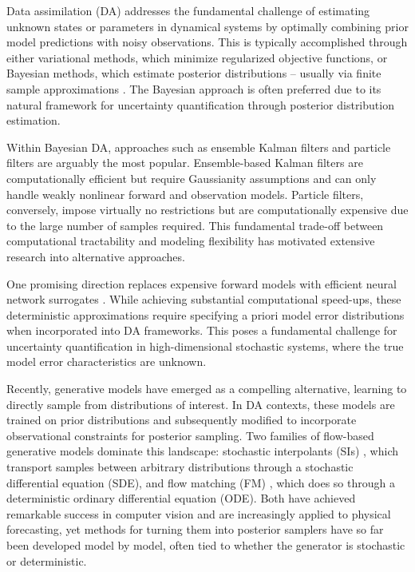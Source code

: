Data assimilation (DA) addresses the fundamental challenge of estimating unknown states or parameters in dynamical systems by optimally combining prior model predictions with noisy observations. This is typically accomplished through either variational methods, which minimize regularized objective functions, or Bayesian methods, which estimate posterior distributions -- usually via finite sample approximations \cite{evensen_data_2022}. The Bayesian approach is often preferred due to its natural framework for uncertainty quantification through posterior distribution estimation.

Within Bayesian DA, approaches such as ensemble Kalman filters and particle filters are arguably the most popular. Ensemble-based Kalman filters are computationally efficient but require Gaussianity assumptions and can only handle weakly nonlinear forward and observation models. Particle filters, conversely, impose virtually no restrictions but are computationally expensive due to the large number of samples required. This fundamental trade-off between computational tractability and modeling flexibility has motivated extensive research into alternative approaches.

One promising direction replaces expensive forward models with efficient neural network surrogates \cite{mucke_deep_2024, cheng_generalised_2022, zhong_reduced-order_2023, chen_reduced-order_2023}. While achieving substantial computational speed-ups, these deterministic approximations require specifying a priori model error distributions when incorporated into DA frameworks. This poses a fundamental challenge for uncertainty quantification in high-dimensional stochastic systems, where the true model error characteristics are unknown.

Recently, generative models have emerged as a compelling alternative, learning to directly sample from distributions of interest. In DA contexts, these models are trained on prior distributions and subsequently modified to incorporate observational constraints for posterior sampling. Two families of flow-based generative models dominate this landscape: stochastic interpolants (SIs) \cite{albergo_stochastic_2023, albergo_building_2023, chen_probabilistic_2024}, which transport samples between arbitrary distributions through a stochastic differential equation (SDE), and flow matching (FM) \cite{lipman_flow_2023}, which does so through a deterministic ordinary differential equation (ODE). Both have achieved remarkable success in computer vision and are increasingly applied to physical forecasting, yet methods for turning them into posterior samplers have so far been developed model by model, often tied to whether the generator is stochastic or deterministic.

